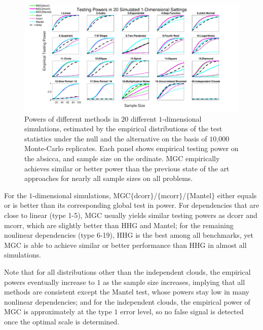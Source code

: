 \documentclass[11pt]{article}
\begin{document}
\begin{figure}[htbp]
\includegraphics[width=1.0\textwidth]{Figures/Fig1}
\caption{
Powers of different methods in $20$ different $1$-dimensional simulations, estimated by the empirical distributions of the test statistics under the null and the alternative on the basis of $10$,$000$ Monte-Carlo replicates.
Each panel shows empirical testing power on the absicca, and sample size on the ordinate.
MGC empirically achieves similar or better power than the previous state of the art approaches for nearly all sample sizes on all problems.}
\label{fig:1D}
\end{figure}

For the $1$-dimensional simulations, MGC$\{$dcorr$\}$/$\{$mcorr$\}$/$\{$Mantel$\}$ either equals or is better than its corresponding global test in power. For dependencies that are close to linear (type 1-5), MGC usually yields similar testing powers as dcorr and mcorr, which are slightly better than HHG and Mantel; for the remaining nonlinear dependencies (type 6-19), HHG is the best among all benchmarks, yet MGC is able to achieve similar or better performance than HHG in almost all simulations. %

Note that for all distributions other than the independent clouds, the empirical powers eventually increase to $1$ as the sample size increases, implying that all methods are consistent except the Mantel test, whose powers stay low in many nonlinear dependencies; and for the independent clouds, the empirical power of MGC is approximately at the type $1$ error level, so no false signal is detected once the optimal scale is determined. 
\end{document}
